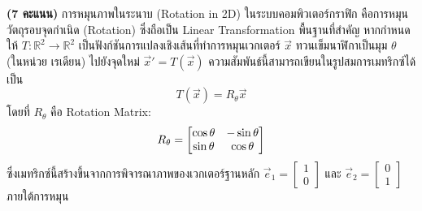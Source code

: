﻿\documentclass[12pt, a4paper]{exam}
\begin{document}
\begin{questions}

\newpage

\question \textbf{(7 คะแนน)} { การหมุนภาพในระนาบ (Rotation in 2D) ในระบบคอมพิวเตอร์กราฟิก คือการหมุนวัตถุรอบ\mbox{จุดกำเนิด}} (Rotation) ซึ่งถือเป็น Linear Transformation พื้นฐานที่สำคัญ หากกำหนดให้ $T : \mathbb{R}^2 \to \mathbb{R}^2$ เป็นฟังก์ชันการแปลงเชิงเส้นที่ทำการหมุน\mbox{เวกเตอร์} $\vec{x}$ ทวนเข็มนาฬิกาเป็นมุม $\theta$ (ในหน่วย เรเดียน) ไปยังจุดใหม่ $\vec{x}' = T(\vec{x})$ ความสัมพันธ์นี้สามารถเขียนในรูป\mbox{สมการ\mbox{เมทริกซ์}}ได้เป็น
\[ T(\vec{x}) = R_\theta \vec{x} \]
โดยที่ $R_\theta$ คือ Rotation Matrix:
\[ R_\theta = \begin{bmatrix} \operatorname{\text{\fontfamily{cmr}\selectfont cos}}\theta & -\operatorname{\text{\fontfamily{cmr}\selectfont sin}}\theta \\ \operatorname{\text{\fontfamily{cmr}\selectfont sin}}\theta & \operatorname{\text{\fontfamily{cmr}\selectfont cos}}\theta \end{bmatrix} \]
ซึ่ง\mbox{เมทริกซ์}นี้สร้างขึ้นจากการพิจารณาภาพของ\mbox{เวกเตอร์}ฐานหลัก $\vec{e}_1 = \begin{bmatrix} 1 \\ 0 \end{bmatrix}$ และ $\vec{e}_2 = \begin{bmatrix} 0 \\ 1 \end{bmatrix}$ ภายใต้การหมุน

\end{questions}
\end{document}
